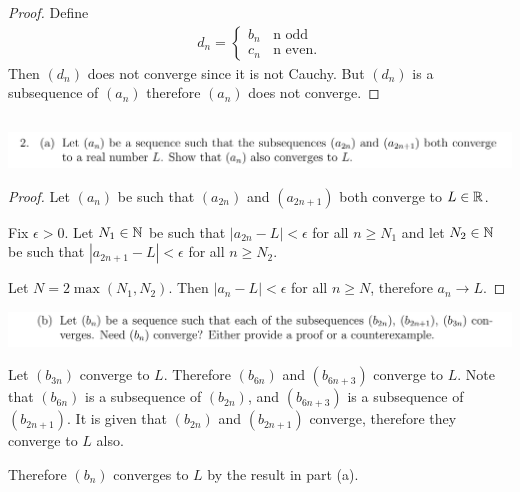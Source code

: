 \documentclass[12pt]{article}
\begin{document}
\begin{enumerate}[label=(\alph*)]
\begin{proof}
    Define
    \begin{align*}
      d_n =
      \begin{cases}
        b_n ~~~~\text{n odd}\\
        c_n ~~~~\text{n even}.
      \end{cases}
    \end{align*}
    Then $(d_n)$ does not converge since it is not Cauchy. But $(d_n)$ is a subsequence of $(a_n)$
    therefore $(a_n)$ does not converge.
  \end{proof}
\end{enumerate}


\newpage
\subsection{}
\begin{mdframed}
\includegraphics[width=400pt]{img/oxford-M2-analysis-I-4-2-a.png}
\end{mdframed}

\begin{proof}
  Let $(a_n)$ be such that $(a_{2n})$ and $(a_{2n + 1})$ both converge to $L \in \mathbb{R}$.

  Fix $\epsilon > 0$. Let $N_1 \in \mathbb{N}$ be such that $|a_{2n} - L| < \epsilon$ for all $n \geq N_1$
  and let $N_2 \in \mathbb{N}$ be such that $|a_{2n + 1} - L| < \epsilon$ for all $n \geq N_2$.

  Let $N = 2\max(N_1, N_2)$. Then $|a_n - L| < \epsilon$ for all $n \geq N$, therefore $a_n \to L$.
\end{proof}

\begin{mdframed}
\includegraphics[width=400pt]{img/oxford-M2-analysis-I-4-2-b.png}
\end{mdframed}

Let $(b_{3n})$ converge to $L$. Therefore $(b_{6n})$ and $(b_{6n + 3})$ converge to $L$. Note that
$(b_{6n})$ is a subsequence of $(b_{2n})$, and $(b_{6n + 3})$ is a subsequence of $(b_{2n +
  1})$. It is given that $(b_{2n})$ and $(b_{2n + 1})$ converge, therefore they converge to $L$
also.

Therefore $(b_n)$ converges to $L$ by the result in part (a).
\end{document}
